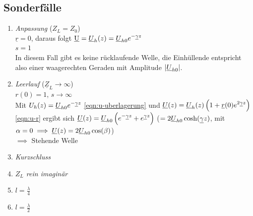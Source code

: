 \subsection{Sonderfälle}
\begin{enumerate}
    \item \emph{Anpassung} ($Z_L = Z_0$)\\
        $\underline{r} = 0$, daraus folgt $\underbar{U}=\underline{U}_h(z)=\underline{U}_{h0} e^{-\underline{\gamma} z}$\\
        $s=1$\\
        In diesem Fall gibt es keine rücklaufende Welle, die Einhüllende entspricht also einer waagerechten Geraden mit Amplitude $|\underline{U}_{h0}|$.
    \item \emph{Leerlauf} ($\underline{Z}_L \to \infty$)\\
        $r(0) = 1$, $s \to \infty$\\
        Mit $U_h(z) = \underline{U}_{h0} e^{-\underline{\gamma} z}$ \eqref{eqn:u-uberlagerung}
        und $\underline{U}(z)=\underline{U}_h(z)\left(1+\underline{r}(0) e^{2\underline{\gamma} z}\right)$
        \eqref{eqn:u-r} ergibt sich
        $\underline{U}(z) = \underline{U}_{h0}\left( e^{-\underline{\gamma} z} + e^{\underline{\gamma} z} \right)$ ($=2 \underline{U}_{h0} \cosh(\underline{\gamma} z)$, mit $\alpha=0 \implies \underline{U}(z)=2 \underline{U}_{h0} \cos(\beta )$)\\
        $\implies$ Stehende Welle
    \item \emph{Kurzschluss}
    \item \emph{$Z_L$ rein imaginär}
    \item \emph{$l = \frac{\lambda}{4}$}
    \item \emph{$l = \frac{\lambda}{2}$}
\end{enumerate}
